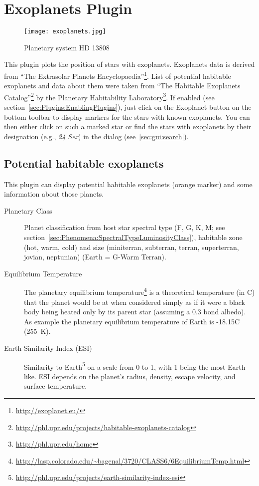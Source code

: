 
\newpage


\section{Exoplanets Plugin}
\label{sec:plugins:Exoplanets}

\begin{figure}[h]
\texttt{[image: exoplanets.jpg]}
\label{fig:Exoplanets}
\caption{Planetary system HD 13808}
\end{figure}

\noindent This plugin plots the position of stars with
exoplanets. Exoplanets data is derived from ``The Extrasolar Planets
Encyclopaedia''\footnote{\url{http://exoplanet.eu/}}. List of
potential habitable exoplanets and data about them were taken from
``The Habitable Exoplanets
Catalog''\footnote{\url{http://phl.upr.edu/projects/habitable-exoplanets-catalog}}
by the Planetary Habitability
Laboratory\footnote{\url{http://phl.upr.edu/home}}.  If enabled (see
section~\ref{sec:Plugins:EnablingPlugins}), just click on the
Exoplanet button  on the bottom
toolbar to display markers for the stars with known exoplanets. You
can then either click on such a marked star or find the stars with
exoplanets by their designation (e.g., \emph{24 Sex}) in the  dialog (see~\ref{sec:gui:search}).


\subsection{Potential habitable exoplanets}
\label{sec:plugins:Exoplanets:habitable}
This plugin can display potential habitable exoplanets (orange marker) and some information about those planets.

\begin{description}
\item[Planetary Class] Planet classification from host star spectral
  type (F, G, K, M; see
  section~\ref{sec:Phenomena:SpectralTypeLuminosityClass}), habitable
  zone (hot, warm, cold) and size (miniterran, subterran, terran,
  superterran, jovian, neptunian) (Earth = G-Warm Terran).
\item[Equilibrium Temperature] The planetary equilibrium
  temperature\footnote{\url{http://lasp.colorado.edu/~bagenal/3720/CLASS6/6EquilibriumTemp.html}}
  is a theoretical temperature (in \degree C) that the planet would be
  at when considered simply as if it were a black body being heated
  only by its parent star (assuming a 0.3 bond albedo). As example the
  planetary equilibrium temperature of Earth is -18.15\degree C (255~K).
\item[Earth Similarity Index (ESI)] Similarity to
  Earth\footnote{\url{http://phl.upr.edu/projects/earth-similarity-index-esi}}
  on a scale from 0 to 1, with 1 being the most Earth-like. ESI
  depends on the planet's radius, density, escape velocity, and
  surface temperature.
\end{description}

